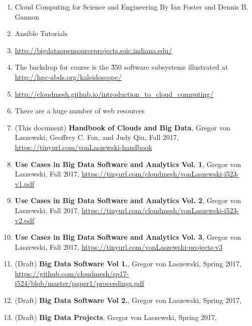 \begin{enumerate}
\item Cloud Computing for Science and Engineering By Ian Foster and
  Dennis
  B. Gannon
\item Ansible Tutorials
\item	\url{http://bigdataopensourceprojects.soic.indiana.edu/}
\item The backdrop for course is the \~350 software subsystems
  illustrated at \url{http://hpc-abds.org/kaleidoscope/}
\item	\url{http://cloudmesh.github.io/introduction_to_cloud_computing/}
\item	There are a huge number of web resources

\item (This document) {\bf Handbook of Clouds and Big Data}, Gregor von Laszewski,
  Geoffrey C. Fox, and Judy Qiu, Fall 2017,
  \url{https://tinyurl.com/vonLaszewski-handbook}

\item {\bf Use Cases in Big Data Software and
  Analytics Vol. 1}, Gregor von Laszewski, Fall 2017,
  \url{https://tinyurl.com/cloudmesh/vonLaszewski-i523-v1.pdf}

\item {\bf Use Cases in Big Data Software and
  Analytics Vol. 2}, Gregor von Laszewski, Fall 2017, \url{https://tinyurl.com/cloudmesh/vonLaszewski-i523-v2.pdf}

\item  {\bf Use Cases in Big Data Software and
  Analytics Vol. 3}, Gregor von Laszewski, Fall 2017, 
  \url{https://tinyurl.com/vonLaszewski-projects-v3}

\item (Draft) {\bf Big Data Software Vol 1.}, Gregor von Laszewski, Spring 2017,
\url{https://github.com/cloudmesh/sp17-i524/blob/master/paper1/proceedings.pdf}

\item (Draft) {\bf Big Data Software Vol 2.}, Gregor von Laszewski, Spring 2017,

\item (Draft) {\bf Big Data Projects}, Gregor von Laszewski, Spring 2017,

\end{enumerate}

